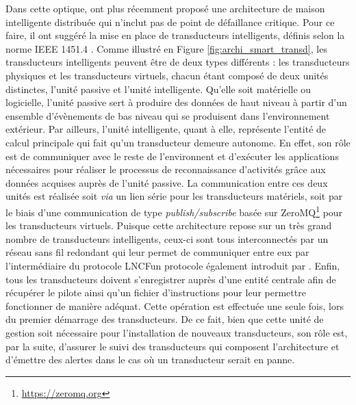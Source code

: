 Dans cette optique, \cite{Plantevin2018} ont plus récemment proposé une architecture de maison intelligente distribuée qui n'inclut pas de point de défaillance critique. Pour ce faire, il ont suggéré la mise en place de transducteurs intelligents, définis selon la norme IEEE 1451.4 \citep{InstituteofElectricalandElectronicsEngineers1999}. Comme illustré en Figure \ref{fig:archi_smart_transd}, les transducteurs intelligents peuvent être de deux types différents : les transducteurs physiques et les transducteurs virtuels, chacun étant composé de deux unités distinctes, l'unité passive et l'unité intelligente. Qu'elle soit matérielle ou logicielle, l'unité passive sert à produire des données de haut niveau à partir d'un ensemble d'évènements de bas niveau qui se produisent dans l'environnement extérieur. Par ailleurs, l'unité intelligente, quant à elle, représente l'entité de calcul principale qui fait qu'un transducteur demeure autonome. En effet, son rôle est de communiquer avec le reste de l'environnent et d'exécuter les applications nécessaires pour réaliser le processus de reconnaissance d'activités grâce aux données acquises auprès de l'unité passive. La communication entre ces deux unités est réalisée soit \textit{via} un lien série pour les transducteurs matériels, soit par le biais d'une communication de type \textit{publish/subscribe} basée sur ZeroMQ\footnote{\url{https://zeromq.org}} pour les transducteurs virtuels. Puisque cette architecture repose sur un très grand nombre de transducteurs intelligents, ceux-ci sont tous interconnectés par un réseau sans fil redondant qui leur permet de communiquer entre eux par l'intermédiaire du protocole \ac{LNCF}\textemdash un protocole également introduit par \cite{Plantevin2017}. Enfin, tous les transducteurs doivent s'enregistrer auprès d'une entité centrale afin de récupérer le pilote ainsi qu'un fichier d'instructions pour leur permettre fonctionner de manière adéquat. Cette opération est effectuée une seule fois, lors du premier démarrage des transducteurs. De ce fait, bien que cette unité de gestion soit nécessaire pour l'installation de nouveaux transducteurs, son rôle est, par la suite, d'assurer le suivi des transducteurs qui composent l'architecture et d'émettre des alertes dans le cas où un transducteur serait en panne.

